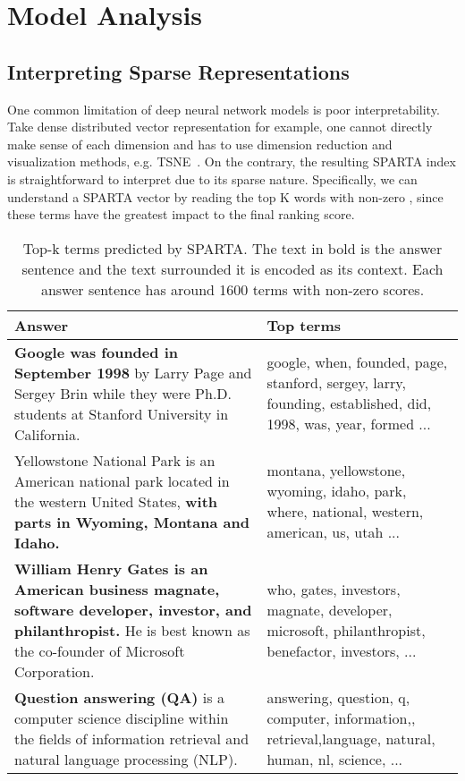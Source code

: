 \documentclass[11pt,a4paper]{article}
\begin{document}
 
\section{Model Analysis}
\subsection{Interpreting Sparse Representations}
One common limitation of deep neural network models is poor interpretability.  Take dense distributed vector representation for example, one cannot directly make sense of each dimension and has to use dimension reduction and visualization methods, e.g. TSNE~\cite{maaten2008visualizing}. On the contrary, the resulting SPARTA index is straightforward to interpret due to its sparse nature. Specifically, we can understand a SPARTA vector by reading the top K words with non-zero , since these terms have the greatest impact to the final ranking score. 

\begin{table*}[!ht]
    \small
    \centering 
    \begin{tabular}[width=16cm]{p{}|p{}} \hline
    \textbf{Answer  }  &  \textbf{Top terms} \\ \hline
    \textbf{Google was founded in September 1998} by Larry Page and Sergey Brin while they were Ph.D. students at Stanford University in California. & google, when, founded, page, stanford, sergey, larry, founding, established, did, 1998, was, year, formed ... \\ \hline
    Yellowstone National Park is an American national park located in the western United States, \textbf{with parts in Wyoming, Montana and Idaho.} & montana,  yellowstone, wyoming, idaho, park, where, national, western, american, us, utah ... \\ \hline 
    \textbf{William Henry Gates is an American business magnate, software developer, investor, and philanthropist.} He is best known as the co-founder of Microsoft Corporation. &  who, gates, investors, magnate, developer, microsoft, philanthropist, benefactor, investors, ...  \\ \hline
    \textbf{Question answering (QA)} is a computer science discipline within the fields of information retrieval and natural language processing (NLP). &  answering, question, q, computer, information,, retrieval,language, natural, human, nl, science, ...  \\ \hline
    \end{tabular}
    \caption{Top-k terms predicted by SPARTA. The text in bold is the answer sentence and the text surrounded it is encoded as its context. Each answer sentence has around 1600 terms with non-zero scores.}
    \label{tbl:example}
\end{table*}
\end{document}
